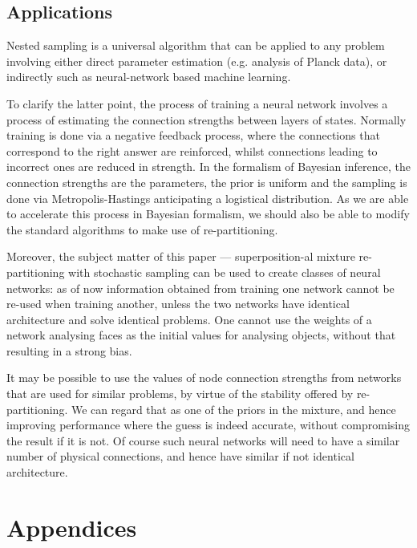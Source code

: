 \documentclass[usenatbib]{mnras}
\begin{document}
\subsection{Applications}
\label{sec:org2e4dea5}
Nested sampling is a universal algorithm that can be applied to any
problem involving either direct parameter estimation (e.g. analysis
of Planck data), or indirectly such as neural-network based machine
learning.

To clarify the latter point, the process of training a neural
network involves a process of estimating the connection strengths
between layers of states. Normally training is done via a negative
feedback process, where the connections that correspond to the
right answer are reinforced, whilst connections leading to
incorrect ones are reduced in strength. In the formalism of
Bayesian inference, the connection strengths are the parameters,
the prior is uniform and the sampling is done via
Metropolis-Hastings anticipating a logistical distribution. As we
are able to accelerate this process in Bayesian formalism, we
should also be able to modify the standard algorithms to make use
of re-partitioning.

Moreover, the subject matter of this paper --- superposition-al
mixture re-partitioning with stochastic sampling can be used to
create classes of neural networks: as of now information obtained
from training one network cannot be re-used when training another,
unless the two networks have identical architecture and solve
identical problems. One cannot use the weights of a network
analysing faces as the initial values for analysing objects,
without that resulting in a strong bias.

It may be possible to use the values of node connection strengths
from networks that are used for similar problems, by virtue of the
stability offered by re-partitioning. We can regard that as one of
the priors in the mixture, and hence improving performance where
the guess is indeed accurate, without compromising the result if it
is not. Of course such neural networks will need to have a similar
number of physical connections, and hence have similar if not
identical architecture.

 

\appendix{}
\section{Appendices}
\label{sec:org4ac944a}
\end{document}
